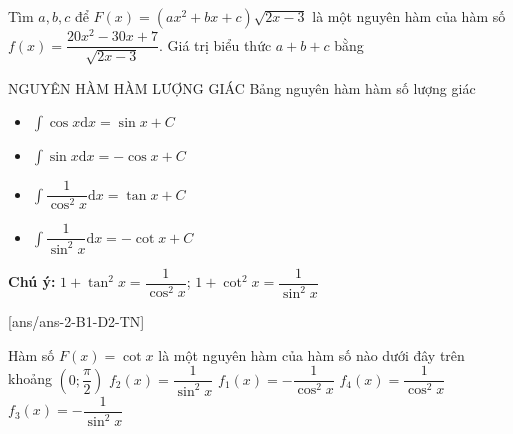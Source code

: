 	\begin{ex}%
		Tìm $a,b,c$ để $F(x)=(a{x^2}+bx+c)\sqrt{2x-3}$ là một nguyên hàm của hàm số $f(x)=\dfrac{20x^2-30x+7}{\sqrt{2x-3}}$.  Giá trị biểu thức $a+b+c$ bằng\\
\end{ex}

\begin{dang}{NGUYÊN HÀM HÀM LƯỢNG GIÁC}
	Bảng nguyên hàm hàm số lượng giác
	\begin{itemize}
		\item $\displaystyle\int{\cos{x} \mathrm{d}x} =\sin{x}+C$
		\item $\displaystyle\int{\sin{x} \mathrm{d}x} =-\cos{x}+C$
		\item $\displaystyle\int{\dfrac{1}{\cos^2{x}} \mathrm{d}x} =\tan{x}+C$
		\item $\displaystyle\int{\dfrac{1}{\sin^2{x}} \mathrm{d}x} =-\cot{x}+C$
	\end{itemize}
	\textbf{Chú ý:}
	$1+\tan ^2x=\dfrac{1}{\cos^2x}$; $1+\cot ^2x=\dfrac{1}{\sin^2x}$
\end{dang}
[ans/ans-2-B1-D2-TN]
\TN
\begin{ex}%
	Hàm số $F(x)=\cot x$ là một nguyên hàm của hàm số nào dưới đây trên khoảng $\left(0;\dfrac{\pi}{2}\right)$
	\choice
	{$f_2(x)=\dfrac{1}{\sin^2x}$}
	{$f_1(x)=-\dfrac{1}{\cos^2x}$}
	{$f_4(x)=\dfrac{1}{\cos^2x}$}
	{\True $f_3(x)=-\dfrac{1}{\sin^2x}$}
\end{ex}

